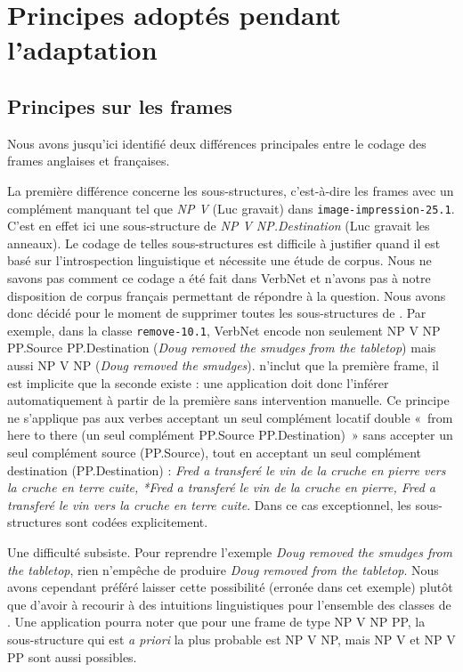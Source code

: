 \section{Principes adoptés pendant l'adaptation}

\subsection{Principes sur les frames}\label{princp}

Nous avons jusqu'ici identifié deux différences principales entre le codage des
frames anglaises et françaises.

La première différence concerne les sous-structures, c'est-à-dire les frames
avec un complément manquant tel que \textit{NP V} (Luc gravait) dans
{\color{blue}\texttt{image-impression-25.1}}. C'est en effet ici une
sous-structure de \textit{NP V NP.Destination} (Luc gravait les anneaux). Le
codage de telles sous-structures est difficile à justifier quand il est basé
sur l'introspection linguistique et nécessite une étude de corpus. Nous ne
savons pas comment ce codage a été fait dans VerbNet et n'avons pas à notre
disposition de corpus français permettant de répondre à la question. Nous avons
donc décidé pour le moment de supprimer toutes les sous-structures de
\verbenet{}. Par exemple, dans la classe {\color{blue}\texttt{remove-10.1}},
VerbNet encode non seulement NP V NP PP.Source PP.Destination (\textit{Doug
removed the smudges from the tabletop}) mais aussi NP V NP (\textit{Doug
removed the smudges}). \verbenet{} n'inclut que la première frame, il est
implicite que la seconde existe : une application doit donc l'inférer
automatiquement à partir de la première sans intervention manuelle. Ce principe
ne s'applique pas aux verbes acceptant un seul complément locatif double «~from
here to there (un seul complément PP.Source PP.Destination)~» sans accepter un
seul complément source (PP.Source), tout en acceptant un seul complément
destination (PP.Destination) : \textit{Fred a transferé le vin de la cruche en
pierre vers la cruche en terre cuite, *Fred a transferé le vin de la cruche en
pierre, Fred a transferé le vin vers la cruche en terre cuite}. Dans ce cas
exceptionnel, les sous-structures sont codées explicitement.

Une difficulté subsiste. Pour reprendre l'exemple \textit{Doug removed the
smudges from the tabletop}, rien n'empêche de produire \textit{Doug removed
from the tabletop}. Nous avons cependant préféré laisser cette possibilité
(erronée dans cet exemple) plutôt que d'avoir à recourir à des intuitions
linguistiques pour l'ensemble des classes de \verbenet{}. Une application
pourra noter que pour une frame de type NP V NP PP, la sous-structure qui est
\textit{a priori} la plus probable est NP V NP, mais NP V et NP V PP sont aussi
possibles.

